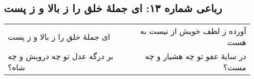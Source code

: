 \begin{center}
\section*{رباعی شماره ۱۳: ای جملهٔ خلق را ز بالا و ز پست}
\label{sec:013}
\begin{longtable}{l p{0.5cm} r}
ای جملهٔ خلق را ز بالا و ز پست
&&
آورده ز لطف خویش از نیست به هست
\\
بر درگه عدل تو چه درویش و چه شاه؟
&&
در سایهٔ عفو تو چه هشیار و چه مست؟
\\
\end{longtable}
\end{center}
